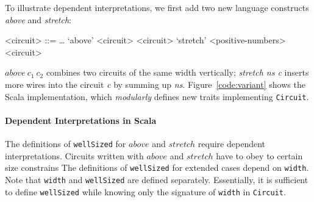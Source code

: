 
To illustrate dependent interpretations, we first add two new language 
constructs \emph{above} and \emph{stretch}:
\setlength{\grammarindent}{5em} %
\begin{grammar}
<circuit> ::= \ldots
\alt `above' <circuit> <circuit>
\alt `stretch' <positive-numbers> <circuit>
\end{grammar}
$above\ c_1\ c_2$ combines two circuits of the same width vertically;
\emph{stretch ns c} inserts more wires into the circuit \emph{c} by
summing up \emph{ns}.
Figure~\ref{code:variant} shows the Scala implementation, which
\emph{modularly} defines new traits implementing \lstinline{Circuit}.



\paragraph{Dependent Interpretations in Scala}
The definitions of \lstinline{wellSized} for $above$ and $stretch$
require dependent interpretations.
Circuits written with $above$ and $stretch$ have to obey to certain
size constrains%
The definitions of \lstinline{wellSized} for extended cases depend on \lstinline{width}.
Note that \lstinline{width} and \lstinline{wellSized} are defined separately.
Essentially, it is sufficient to define \lstinline{wellSized} while
knowing only the signature of \lstinline{width} in \lstinline{Circuit}.


